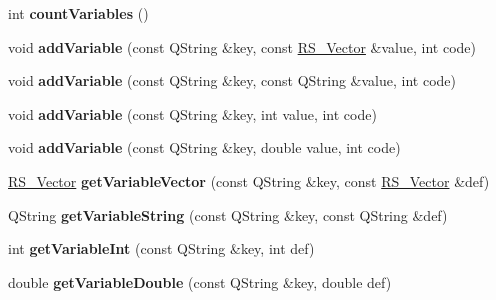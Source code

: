 \begin{DoxyCompactItemize}
\item 
\hypertarget{classRS__Graphic_a256331a05868069dff1e4b1380f5f519}{int {\bfseries count\-Variables} ()}\label{classRS__Graphic_a256331a05868069dff1e4b1380f5f519}

\item 
\hypertarget{classRS__Graphic_abec6263809c6d6bd12b7e7ebb1ef4f13}{void {\bfseries add\-Variable} (const Q\-String \&key, const \hyperlink{classRS__Vector}{R\-S\-\_\-\-Vector} \&value, int code)}\label{classRS__Graphic_abec6263809c6d6bd12b7e7ebb1ef4f13}

\item 
\hypertarget{classRS__Graphic_a474d2db5ec962c59f9dc9974cd7b5855}{void {\bfseries add\-Variable} (const Q\-String \&key, const Q\-String \&value, int code)}\label{classRS__Graphic_a474d2db5ec962c59f9dc9974cd7b5855}

\item 
\hypertarget{classRS__Graphic_a1c174efb429e0985d7d609ec9f2269e9}{void {\bfseries add\-Variable} (const Q\-String \&key, int value, int code)}\label{classRS__Graphic_a1c174efb429e0985d7d609ec9f2269e9}

\item 
\hypertarget{classRS__Graphic_a8752856b11ebf23fa813ac2079d718cf}{void {\bfseries add\-Variable} (const Q\-String \&key, double value, int code)}\label{classRS__Graphic_a8752856b11ebf23fa813ac2079d718cf}

\item 
\hypertarget{classRS__Graphic_ada2df3f201be4d7dea152c12ab7028f2}{\hyperlink{classRS__Vector}{R\-S\-\_\-\-Vector} {\bfseries get\-Variable\-Vector} (const Q\-String \&key, const \hyperlink{classRS__Vector}{R\-S\-\_\-\-Vector} \&def)}\label{classRS__Graphic_ada2df3f201be4d7dea152c12ab7028f2}

\item 
\hypertarget{classRS__Graphic_af70f02d1050d76e148c8f3d6a0fb58a8}{Q\-String {\bfseries get\-Variable\-String} (const Q\-String \&key, const Q\-String \&def)}\label{classRS__Graphic_af70f02d1050d76e148c8f3d6a0fb58a8}

\item 
\hypertarget{classRS__Graphic_a3c59b139bb5535a0254a3551a4fdc964}{int {\bfseries get\-Variable\-Int} (const Q\-String \&key, int def)}\label{classRS__Graphic_a3c59b139bb5535a0254a3551a4fdc964}

\item 
\hypertarget{classRS__Graphic_a1a61ee4f8752821bda85a1e7ffc5300d}{double {\bfseries get\-Variable\-Double} (const Q\-String \&key, double def)}\label{classRS__Graphic_a1a61ee4f8752821bda85a1e7ffc5300d}


\end{DoxyCompactItemize}
